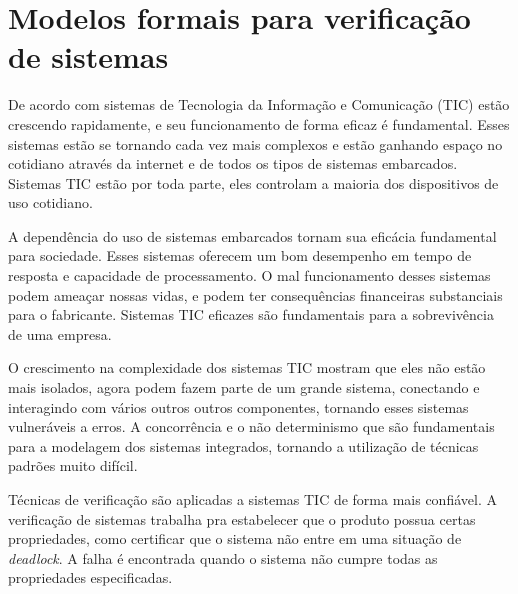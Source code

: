 

\section{Modelos formais para verificação de sistemas}
 
De acordo com  sistemas de Tecnologia da Informação e Comunicação (TIC) estão crescendo rapidamente, e seu funcionamento de forma eficaz é fundamental. Esses sistemas estão se tornando cada vez mais complexos e estão ganhando espaço no cotidiano através da internet e de todos os tipos de sistemas embarcados. Sistemas TIC estão por toda parte, eles controlam a maioria dos dispositivos de uso cotidiano.

A dependência do uso de sistemas embarcados tornam sua eficácia fundamental para sociedade. Esses sistemas oferecem um bom desempenho em tempo de resposta e capacidade de processamento. O mal funcionamento desses sistemas podem ameaçar nossas vidas, e podem ter consequências financeiras substanciais para o fabricante. Sistemas TIC eficazes são fundamentais para a sobrevivência de uma empresa.


O crescimento na complexidade dos sistemas TIC mostram que eles não estão mais isolados, agora podem fazem parte de um grande sistema, conectando e interagindo com vários outros outros componentes, tornando esses sistemas vulneráveis a erros. 
A concorrência e o não determinismo que são fundamentais para a modelagem dos sistemas integrados, tornando a utilização de técnicas padrões muito difícil.

Técnicas de verificação são aplicadas a sistemas TIC de forma mais confiável. A verificação de sistemas trabalha pra estabelecer que o produto possua certas propriedades, como certificar que o sistema não entre em uma situação de \textit{deadlock}. A falha é encontrada quando o sistema não cumpre todas as propriedades especificadas.



